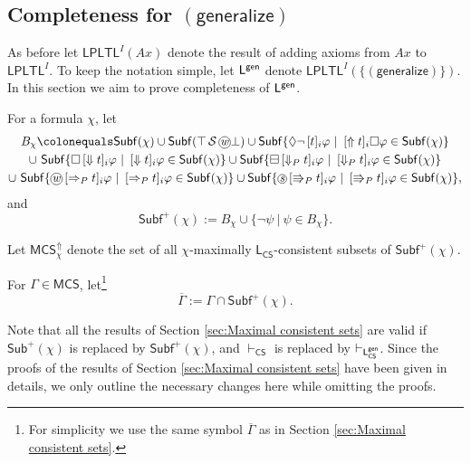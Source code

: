 \documentclass[envcountsect,envcountsame,oribibl,orivec]{llncs}
\newcommand*\circled[1]{\tikz[baseline=(char.base)]{
		\node[shape=circle,draw,inner sep=0.4pt] (char) {#1};}}
\newcommand{\lalways}{\Box}
\newcommand{\leventually}{\Diamond}
\newcommand{\lsofar}{\boxminus}
\newcommand{\lsince}{{\,\mathcal{S}\,}}
\newcommand{\wprevious}{\circled{\textit{w}}}
\newcommand{\sprevious}{\circled{\textit{s}}}
\newcommand{\LPLTL}{\textsf{LPLTL}}
\newcommand{\jbox}[1]{\left[#1\right]\!}
\newcommand{\talwaysaccess}{\Downarrow}
\newcommand{\tgeneralize}{\Uparrow}
\newcommand{\tsprevright}{\Rrightarrow_P}
\newcommand{\twprevright}{\Rightarrow_P}
\newcommand{\CS}{\textsf{CS}}
\newcommand{\agent}{i}
\newcommand{\generalizeprinciple}{\ensuremath{(\textsf{generalize})}}
\renewcommand{\phi}{\varphi}
\newcommand{\Sub}{\mathsf{Sub}}
\newcommand{\Subf}{\mathsf{Subf}}
\newcommand{\MCS}{\mathsf{MCS}}
\begin{document}

\subsection{Completeness for $\generalizeprinciple$}
\label{sec:Completeness for generalize}

As before let $\LPLTL^I(Ax)$ denote the result of adding axioms  from $Ax$ to $\LPLTL^I$. To keep the notation simple,  let ${\sf L}^{\sf gen}$ denote $\LPLTL^I (\{\generalizeprinciple\})$. In this section we aim to prove completeness of ${\sf L}^{\sf gen}$.

For a formula $\chi$, let 
%
\begin{gather*}
	B_\chi \colonequals \Subf(\chi) \cup  \Subf(\top \lsince \wprevious \bot)  \cup \Subf \{  \leventually \neg \jbox{t}_\agent \phi \ |\ \jbox{\tgeneralize t}_\agent \lalways \phi \in \Subf(\chi) \} 
	\\
	\cup\  \Subf \{  \lalways \jbox{\talwaysaccess t}_\agent \phi \ |\ \jbox{\talwaysaccess t}_\agent  \phi \in \Subf(\chi) \} \cup \Subf \{  \lsofar \jbox{\talwaysaccess_P t}_\agent \phi \ |\ \jbox{\talwaysaccess_P t}_\agent  \phi \in \Subf(\chi) \}
	\\
	\cup\ \Subf \{  \wprevious \jbox{\twprevright t}_\agent \phi \ |\ \jbox{\twprevright t}_\agent  \phi \in \Subf(\chi) \} \cup \Subf \{  \sprevious \jbox{\tsprevright t}_\agent \phi \ |\ \jbox{\tsprevright t}_\agent  \phi \in \Subf(\chi) \},
\end{gather*}
%
and
$$\Subf^+ (\chi) := B_\chi \cup \{ \neg \psi \ |\  \psi \in B_\chi \}.$$


Let $\MCS_\chi^\tgeneralize$ denote the set of all $\chi$-maximally $\mathsf{L}_\CS$-consistent subsets of $\Subf^+ (\chi)$. 


For $\Gamma\in \MCS$, let\footnote{For simplicity we use the same symbol $\overline{\Gamma}$ as in Section \ref{sec:Maximal consistent sets}.} $$\overline{\Gamma} := \Gamma \cap \Subf^+ (\chi).$$ 

Note that all the results of Section \ref{sec:Maximal consistent sets} are valid if  $\Sub^+ (\chi)$ is replaced by $\Subf^+ (\chi)$, and $\vdash_\CS$ is replaced by $\vdash_{{\sf L}^{\sf gen}_\CS}$. Since the  proofs of the results of Section \ref{sec:Maximal consistent sets} have been given in details, we only outline the necessary changes here while omitting the proofs.
\end{document}
